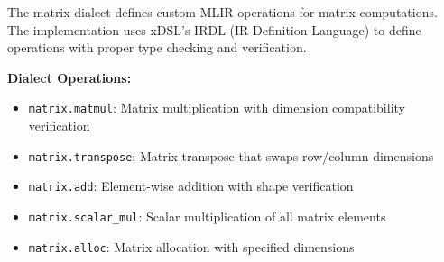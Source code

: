 \documentclass[11pt,a4paper]{article}
\begin{document}
The matrix dialect defines custom MLIR operations for matrix computations. The implementation uses xDSL's IRDL (IR Definition Language) to define operations with proper type checking and verification.

\textbf{Dialect Operations:}
\begin{itemize}
    \item \texttt{matrix.matmul}: Matrix multiplication with dimension compatibility verification
    \item \texttt{matrix.transpose}: Matrix transpose that swaps row/column dimensions
    \item \texttt{matrix.add}: Element-wise addition with shape verification
    \item \texttt{matrix.scalar\_mul}: Scalar multiplication of all matrix elements
    \item \texttt{matrix.alloc}: Matrix allocation with specified dimensions
\end{itemize}
\end{document}
